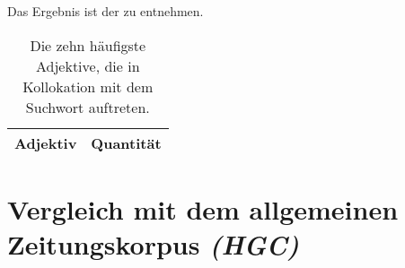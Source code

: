 \documentclass[%
	type=document,%
  	style=article,%
  	media=print,
  	pages=oneside,%
  	prefixLecturer=Dozenten:,
  	author=multiple,
]{unihildesheim} %
\begin{document}
Das Ergebnis ist der  zu entnehmen.
\begin{table}[htpb]\label{t}
	\center
	\begin{tabularx}{0.5\textwidth}{lr}
		\toprule
		\textbf{Adjektiv} & \textbf{Quantität}\\
		\midrule
		
		\bottomrule
	\end{tabularx}
	\caption{Die zehn häufigste Adjektive, die in Kollokation mit dem Suchwort
	auftreten.}
	\label{tab:adj_mpraes}
\end{table}

\section{Vergleich mit dem allgemeinen Zeitungskorpus \textit{(HGC)}}
\end{document}
